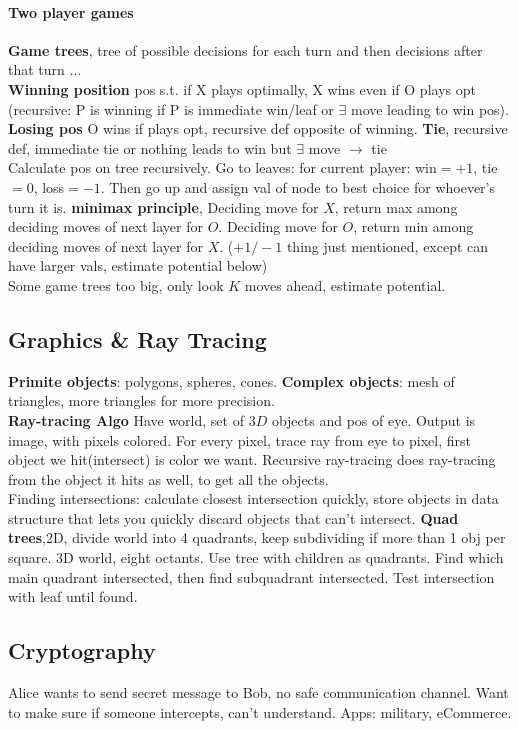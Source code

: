 \paragraph{Two player games} \textbf{Game trees}, tree of possible decisions for each turn and then decisions after that turn ...
\\\textbf{Winning position} pos s.t. if X plays optimally, X wins even if O plays opt (recursive: P is winning if P is immediate win/leaf or $\exists$ move leading to win pos). \textbf{Losing pos} O wins if plays opt, recursive def opposite of winning. \textbf{Tie}, recursive def, immediate tie or nothing leads to win but $\exists$ move $\to$ tie
\\ Calculate pos on tree recursively. Go to leaves: for current player: win$=+1$, tie$=0$, loss$=-1$. Then go up and assign val of node to best choice for whoever's turn it is. \textbf{minimax principle}, Deciding move for $X$, return max among deciding moves of next layer for $O$. Deciding move for $O$, return min among deciding moves of next layer for $X$. ($+1/-1$ thing just mentioned, except can have larger vals, estimate potential below)
\\ Some game trees too big, only look $K$ moves ahead, estimate potential.
\subsection{Graphics \& Ray Tracing} \textbf{Primite objects}: polygons, spheres, cones. \textbf{Complex objects}: mesh of triangles, more triangles for more precision.
\\ \textbf{Ray-tracing Algo} Have world, set of $3D$ objects and pos of eye. Output is image, with pixels colored. For every pixel, trace ray from eye to pixel, first object we hit(intersect) is color we want. Recursive ray-tracing does ray-tracing from the object it hits as well, to get all the objects.
\\ Finding intersections: calculate closest intersection quickly, store objects in data structure that lets you quickly discard objects that can't intersect. \textbf{Quad trees},2D, divide world into 4 quadrants, keep subdividing if more than 1 obj per square. 3D world, eight octants. Use tree with children as quadrants. Find which main quadrant intersected, then find subquadrant intersected. Test intersection with leaf until found.
\subsection{Cryptography}
Alice wants to send secret message to Bob, no safe communication channel. Want to make sure if someone intercepts, can't understand. Apps: military, eCommerce.
\vspace{-7 pt}
